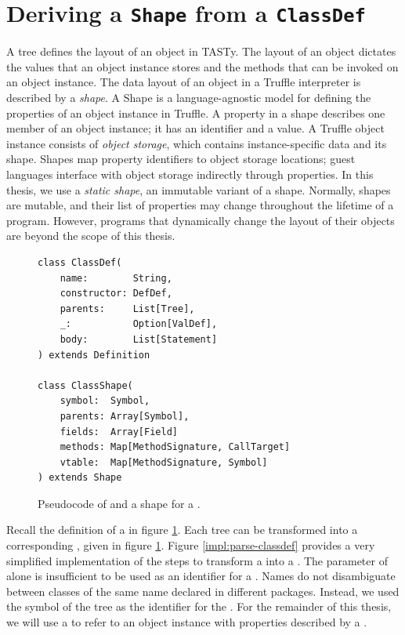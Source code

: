 \section{Deriving a \texttt{Shape} from a \texttt{ClassDef}}
\label{impl:subsection:classdef}

A  tree defines the layout of an object in TASTy.
The layout of an object dictates the values that an object instance stores and the methods that can be invoked on an object instance.
The data layout of an object in a Truffle interpreter is described by a \textit{shape}\cite{self:prototypes,truffle:object-model}.
A Shape is a language-agnostic model for defining the properties of an object instance in Truffle.
A property in a shape describes one member of an object instance; it has an identifier and a value.
A Truffle object instance consists of \textit{object storage}, which contains instance-specific data and its shape.
Shapes map property identifiers to object storage locations; guest languages interface with object storage indirectly through properties.
In this thesis, we use a \textit{static shape}, an immutable variant of a shape.
Normally, shapes are mutable, and their list of properties may change throughout the lifetime of a program\cite{truffleruby:object-model}.
However, programs that dynamically change the layout of their objects\cite{java:reflection} are beyond the scope of this thesis.

\begin{figure}[!htb]
\begin{verbatim}
class ClassDef(
	name:        String,
	constructor: DefDef, 
	parents:     List[Tree], 
	_:           Option[ValDef], 
	body:        List[Statement]
) extends Definition

class ClassShape(
	symbol:  Symbol,
	parents: Array[Symbol],
	fields:  Array[Field]
	methods: Map[MethodSignature, CallTarget]
	vtable:  Map[MethodSignature, Symbol]
) extends Shape
\end{verbatim}
\caption{Pseudocode of  and a shape for a .}
\label{impl:class_shape}
\end{figure}

Recall the definition of a  in figure \ref{impl:class_shape}.
Each  tree can be transformed into a corresponding , given in figure \ref{impl:class_shape}.
Figure \ref{impl:parse-classdef} provides a very simplified implementation of the steps to transform a  into a .
The  parameter of  alone is insufficient to be used as an identifier for a .
Names do not disambiguate between classes of the same name declared in different packages.
Instead, we used the symbol of the  tree as the identifier for the .
For the remainder of this thesis, we will use a  to refer to an object instance with properties described by a .

